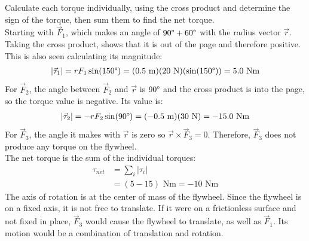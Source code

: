 \documentclass[a4paper]{article}
\newcommand\m{\text{ m}}
\newcommand\Nm{\text{ Nm}}
\begin{document}
\begin{shaded}
\begin{center}
    \end{center}
    Calculate each torque individually, using the cross product and determine the sign of the torque, then sum them to find the net torque.
    \vspace{1mm}\\
    Starting with $\vec{F}_1$, which makes an angle of $90\degree + 60\degree$ with the radius vector $\vec{r}$. Taking the cross product, shows that it is out of the page and therefore positive. This is also seen calculating its magnitude:
    \begin{align*}
        |\vec{\tau}_1| = rF_1\sin(150\degree) = (0.5\m)(20\text{ N})(\sin(150\degree)) = 5.0\Nm
    \end{align*}
    For $\vec{F}_2$, the angle between $\vec{F}_2$ and $\vec{r}$ is $90\degree$ and the cross product is into the page, so the torque value is negative. Its value is:
    \begin{align*}
        |\vec{\tau}_2| = -rF_2\sin(90\degree) = (-0.5\m)(30\text{ N}) = -15.0\Nm
    \end{align*}
    For $\vec{F}_3$, the angle it makes with $\vec{r}$ is zero so $\vec{r}\times\vec{F}_3 = 0$. Therefore, $\vec{F}_3$ does not produce any torque on the flywheel.
    \vspace{1mm}\\
    The net torque is the sum of the individual torques:
    \begin{align*}
        \tau_{net} &= \sum_{i}|\tau_i|\\
        &= (5 - 15)\Nm = -10\Nm
    \end{align*}
    The axis of rotation is at the center of mass of the flywheel. Since the flywheel is on a fixed axis, it is not free to translate. If it were on a frictionless surface and not fixed in place, $\vec{F}_3$ would cause the flywheel to translate, as well as $\vec{F}_1$. Its motion would be a combination of translation and rotation.
\end{shaded}
\end{document}
